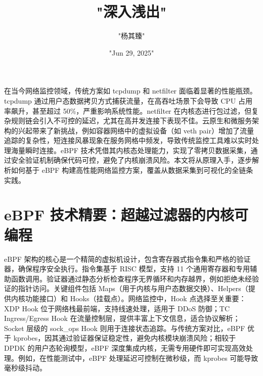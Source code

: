 \title{"深入浅出"}
\author{"杨其臻"}
\date{"Jun 29, 2025"}
\maketitle
在当今网络监控领域，传统方案如 tcpdump 和 netfilter 面临着显著的性能瓶颈。tcpdump 通过用户态数据拷贝方式捕获流量，在高吞吐场景下会导致 CPU 占用率飙升，甚至超过 50\%{}，严重影响系统性能。netfilter 在内核态进行包过滤，但复杂规则链会引入不可控的延迟，尤其在高并发连接下表现不佳。云原生和微服务架构的兴起带来了新挑战，例如容器网络中的虚拟设备（如 veth pair）增加了流量追踪的复杂性，短连接风暴现象在服务网格中频发，导致传统监控工具难以实时处理海量瞬时连接。eBPF 技术凭借其内核态处理能力，实现了零拷贝数据采集，通过安全验证机制确保代码可控，避免了内核崩溃风险。本文将从原理入手，逐步解析如何基于 eBPF 构建高性能网络监控方案，覆盖从数据采集到可视化的全链条实践。\par
\chapter{eBPF 技术精要：超越过滤器的内核可编程}
eBPF 架构的核心是一个精简的虚拟机设计，包含寄存器式指令集和严格的验证器，确保程序安全执行。指令集基于 RISC 模型，支持 11 个通用寄存器和专用辅助函数调用。验证器通过静态分析检查程序无界循环和内存越界，例如拒绝未经验证的指针访问。关键组件包括 Maps（用于内核与用户态数据交换）、Helpers（提供内核功能接口）和 Hooks（挂载点）。网络监控中，Hook 点选择至关重要：XDP Hook 位于网络栈最前端，支持线速处理，适用于 DDoS 防御；TC Ingress/Egress Hook 在流量控制层，提供丰富上下文信息，适合协议解析；Socket 层级的 sock\_{}ops Hook 则用于连接状态追踪。与传统方案对比，eBPF 优于 kprobes，因其通过验证器保证稳定性，避免内核模块崩溃风险；相较于 DPDK 的用户态轮询模型，eBPF 深度集成内核，无需专用硬件即可实现高效处理。例如，在性能测试中，eBPF 处理延迟可控制在微秒级，而 kprobes 可能导致毫秒级抖动。\par
